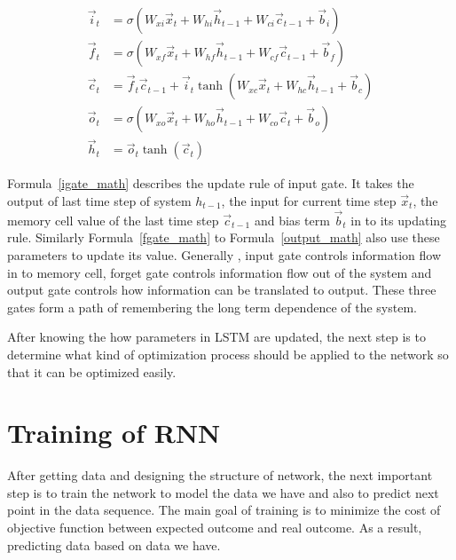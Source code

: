 \documentclass[officiallayout]{tktla}
\newcommand{\wtmat}[2]{W_{#1 #2}}
\newcommand{\igate}{i}
\newcommand{\fgate}{f}
\newcommand{\ogate}{o}
\newcommand{\state}{c}
\begin{document}
\begin{align}
\vec{\igate}_t &= \sigma\left(\wtmat{x}{\igate} \vec{x}_t + \wtmat{h}{\igate} \vec{h}_{t-1} + \wtmat{\state}{\igate} \vec{\state}_{t-1}  + \vec{b}_\igate\right) \label{igate_math}\\
\vec{\fgate}_t &= \sigma\left(\wtmat{x}{\fgate} \vec{x}_t + \wtmat{h}{\fgate} \vec{h}_{t-1} + \wtmat{\state}{\fgate} \vec{\state}_{t-1} + \vec{b}_\fgate \right) \label{fgate_math}\\
\vec{\state}_t &= \vec{\fgate}_t \vec{\state}_{t-1} + \vec{\igate}_t \tanh \left(\wtmat{x}{\state} \vec{x}_t + \wtmat{h}{\state} \vec{h}_{t-1} + \vec{b}_\state\right) \label{cell}\\
\vec{\ogate}_t &= \sigma\left(\wtmat{x}{\ogate} \vec{x}_t + \wtmat{h}{\ogate} \vec{h}_{t-1} + \wtmat{\state}{\ogate} \vec{\state}_{t} + \vec{b}_\ogate\right)\label{ogate_math}\\
\vec{h}_t &= \vec{\ogate}_t \tanh(\vec{\state}_t) \label{output_math}
\end{align}

Formula~\ref{igate_math} describes the update rule of input gate. It takes the output of last time step of system $h_{t-1}$, the input for current time step $\vec{x}_t$, the memory cell value of the last time step $\vec{c}_{t-1}$ and bias term $\vec{b}_t$ in to its updating rule. Similarly Formula~\ref{fgate_math} to Formula~\ref{output_math} also use these parameters to update its value. Generally , input gate controls information flow in to memory cell, forget gate controls information flow out of the system and output gate controls how information can be translated to output. These three gates form a path of remembering the long term dependence of the system.

After knowing the how parameters in LSTM are updated, the next step is to determine what kind of optimization process should be applied to the network so that it can be optimized easily.

\section{Training of RNN}\label{training_rnn}
After getting data and designing the structure of network, the next important step is to train the network to model the data we have and also to predict next point in the data sequence. The main goal of training is to minimize the cost of objective function between expected outcome and real outcome. As a result, predicting data based on data we have.
\end{document}
